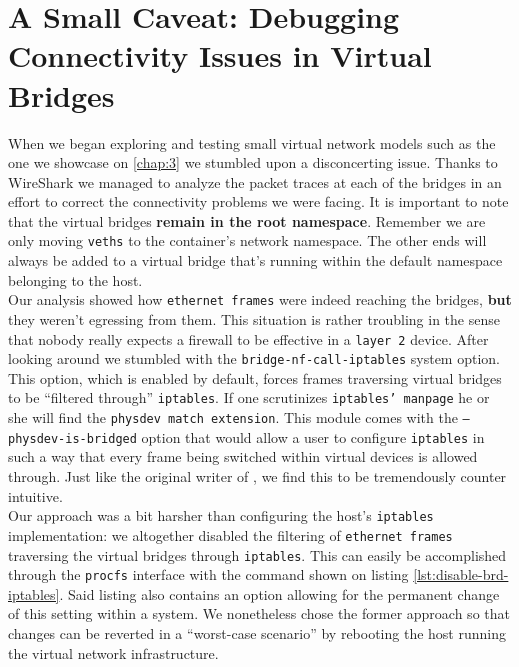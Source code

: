     \section{A Small Caveat: Debugging Connectivity Issues in Virtual Bridges} \label{sec:bridge-caveats}
        When we began exploring and testing small virtual network models such as the one we showcase on \ref{chap:3} we stumbled upon a disconcerting issue. Thanks to WireShark \cite{bib:wireshark} we managed to analyze the packet traces at each of the bridges in an effort to correct the connectivity problems we were facing. It is important to note that the virtual bridges \textbf{remain in the root namespace}. Remember we are only moving \texttt{veths} to the container's network namespace. The other ends will always be added to a virtual bridge that's running within the default namespace belonging to the host.\\


        Our analysis showed how \texttt{ethernet frames} were indeed reaching the bridges, \textbf{but} they weren't egressing from them. This situation is rather troubling in the sense that nobody really expects a firewall to be effective in a \texttt{layer 2} device. After looking around we stumbled with the \texttt{\allowbreak bridge-nf-call-iptables} system option. This option, which is enabled by default, forces frames traversing virtual bridges to be ``filtered through'' \texttt{iptables}. If one scrutinizes \texttt{iptables' manpage} he or she will find the \texttt{physdev match extension}. This module comes with the \texttt{--physdev-is-bridged} option that would allow a user to configure \texttt{iptables} in such a way that every frame being switched within virtual devices is allowed through. Just like the original writer of \cite{bib:brd-iptables-calls}, we find this to be tremendously counter intuitive.\\

        Our approach was a bit harsher than configuring the host's \texttt{iptables} implementation: we altogether disabled the filtering of \texttt{ethernet frames} traversing the virtual bridges through \texttt{iptables}. This can easily be accomplished through the \texttt{procfs} interface with the command shown on listing \ref{lst:disable-brd-iptables}. Said listing also contains an option allowing for the permanent change of this setting within a system. We nonetheless chose the former approach so that changes can be reverted in a ``worst-case scenario'' by rebooting the host running the virtual network infrastructure.\\

